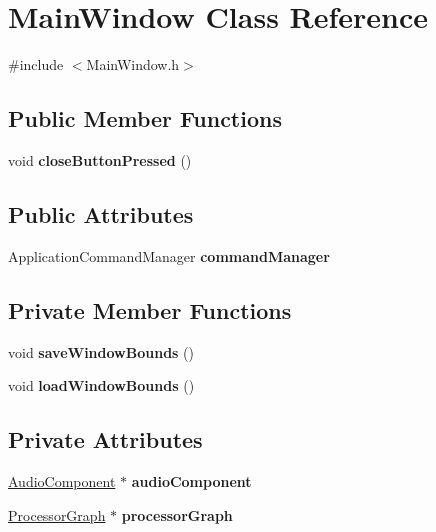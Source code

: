 \hypertarget{classMainWindow}{\section{Main\-Window Class Reference}
\label{classMainWindow}
}


{\ttfamily \#include $<$Main\-Window.\-h$>$}

\subsection*{Public Member Functions}
\begin{DoxyCompactItemize}
\item 
\hypertarget{classMainWindow_ac422fd3f1931a97b30d5efc8b6fc3123}{void {\bfseries close\-Button\-Pressed} ()}\label{classMainWindow_ac422fd3f1931a97b30d5efc8b6fc3123}

\end{DoxyCompactItemize}
\subsection*{Public Attributes}
\begin{DoxyCompactItemize}
\item 
\hypertarget{classMainWindow_ae36bb0085b5650e00bca6bab107dc691}{Application\-Command\-Manager {\bfseries command\-Manager}}\label{classMainWindow_ae36bb0085b5650e00bca6bab107dc691}

\end{DoxyCompactItemize}
\subsection*{Private Member Functions}
\begin{DoxyCompactItemize}
\item 
\hypertarget{classMainWindow_ae568da7ab0da00891e838c197e9b0904}{void {\bfseries save\-Window\-Bounds} ()}\label{classMainWindow_ae568da7ab0da00891e838c197e9b0904}

\item 
\hypertarget{classMainWindow_a0787392bb77872c6765a390918cca794}{void {\bfseries load\-Window\-Bounds} ()}\label{classMainWindow_a0787392bb77872c6765a390918cca794}

\end{DoxyCompactItemize}
\subsection*{Private Attributes}
\begin{DoxyCompactItemize}
\item 
\hypertarget{classMainWindow_acdaba8b56c01e387346f503c46070d60}{\hyperlink{classAudioComponent}{Audio\-Component} $\ast$ {\bfseries audio\-Component}}\label{classMainWindow_acdaba8b56c01e387346f503c46070d60}

\item 
\hypertarget{classMainWindow_a5a30971233877ddb0bf2fb3436d39bfb}{\hyperlink{classProcessorGraph}{Processor\-Graph} $\ast$ {\bfseries processor\-Graph}}\label{classMainWindow_a5a30971233877ddb0bf2fb3436d39bfb}

\end{DoxyCompactItemize}


